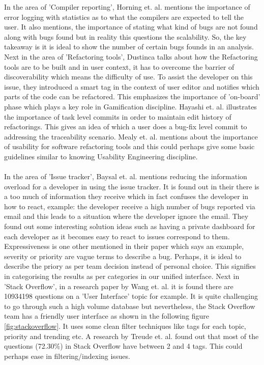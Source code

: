 In the area of 'Compiler reporting', Horning et. al. \cite{horning} mentions the importance of error logging with statistics as to what the compilers are expected to tell the user. It also mentions, the importance of stating what kind of bugs are not found along with bugs found but in reality this questions the scalability. So, the key takeaway is it is ideal to show the number of certain bugs founds in an analysis. Next in the area of 'Refactoring tools', Dustinca \cite{dustinca} talks about how the Refactoring tools are to be built and in user context, it has to overcome the barrier of discoverability which means the difficulty of use. To assist the developer on this issue, they introduced a smart tag in the context of user editor and notifies which parts of the code can be refactored. This emphasizes the importance of 'on-board' phase which plays a key role in Gamification \cite{gamify} discipline. Hayashi et. al. \cite{Hayashi} illustrates the importance of task level commits in order to maintain edit history of refactorings. This gives an idea of which a user does a bug-fix level commit to addressing the traceability scenario. Mealy et. al. \cite{Mealy} mentions about the importance of usability for software refactoring tools and this could perhaps give some basic guidelines similar to knowing Usability Engineering \cite{usability} discipline. \\ \\

In the area of 'Issue tracker', Baysal et. al. \cite{Baysal} mentions reducing the information overload for a developer in using the issue tracker. It is found out in their there is a too much of information they receive which in fact confuses the developer in how to react, example: the developer receive a high number of bugs reported via email and this leads to a situation where the developer ignore the email. They found out some interesting solution ideas such as having a private dashboard for each developer as it becomes easy to react to issues correspond to them. Expressiveness is one other mentioned in their paper which says an example, severity or priority are vague terms to describe a bug. Perhaps, it is ideal to describe the priory as per team decision instead of personal choice.  This signifies in categorising the results as per categories in our unified interface. Next in 'Stack Overflow', in a research paper by Wang et. al. \cite{stack} it is found there are 10934198 questions on a 'User Interface' topic for example. It is quite challenging to go through such a high volume database but nevertheless, the Stack Overflow team has a friendly user interface as shown in the following figure \ref{fig:stackoverflow}. It uses some clean filter techniques like tags for each topic, priority and trending etc. A research by Treude et. al. \cite{Treude.2011} found out that most of the questions (72.30\%) in Stack Overflow have between 2 and 4 tags. This could perhaps ease in filtering/indexing issues. \\ \\


